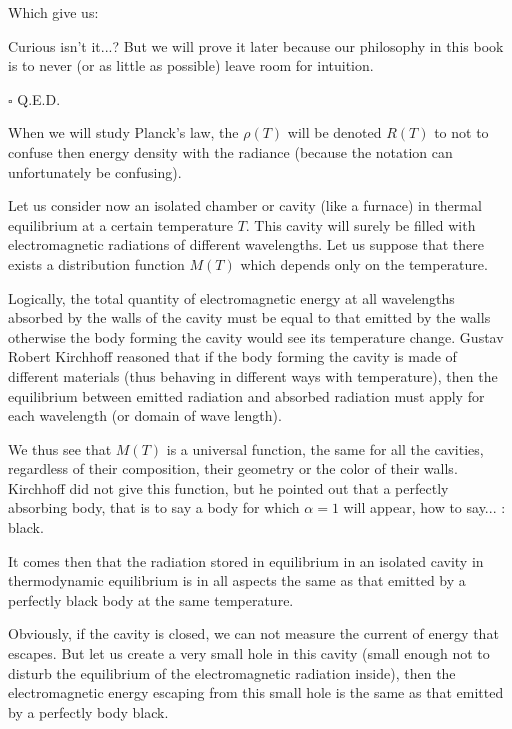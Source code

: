 \begin{dem}
	Which give us:
	
	Curious isn't it...? But we will prove it later because our philosophy in this book is to never (or as little as possible) leave room for intuition.
	\begin{flushright}
		$\square$  Q.E.D.
	\end{flushright}
	\end{dem}
	\begin{tcolorbox}[title=Remark,colframe=black,arc=10pt]
	When we will study Planck's law, the $\rho(T)$ will be denoted $R (T)$ to not to confuse then energy density with the radiance (because the notation can unfortunately be confusing).
	\end{tcolorbox}
	Let us consider now an isolated chamber or cavity (like a furnace) in thermal equilibrium at a certain temperature $T$. This cavity will surely be filled with electromagnetic radiations of different wavelengths. Let us suppose that there exists a distribution function $M (T)$ which depends only on the temperature.

	Logically, the total quantity of electromagnetic energy at all wavelengths absorbed by the walls of the cavity must be equal to that emitted by the walls otherwise the body forming the cavity would see its temperature change. Gustav Robert Kirchhoff reasoned that if the body forming the cavity is made of different materials (thus behaving in different ways with temperature), then the equilibrium between emitted radiation and absorbed radiation must apply for each wavelength (or domain of wave length).

	We thus see that $M(T)$ is a universal function, the same for all the cavities, regardless of their composition, their geometry or the color of their walls. Kirchhoff did not give this function, but he pointed out that a perfectly absorbing body, that is to say a body for which $\alpha=1$ will appear, how to say... : black.

	It comes then that the radiation stored in equilibrium in an isolated cavity in thermodynamic equilibrium is in all aspects the same as that emitted by a perfectly black body at the same temperature.

	Obviously, if the cavity is closed, we can not measure the current of energy that escapes. But let us create a very small hole in this cavity (small enough not to disturb the equilibrium of the electromagnetic radiation inside), then the electromagnetic energy escaping from this small hole is the same as that emitted by a perfectly body black.

